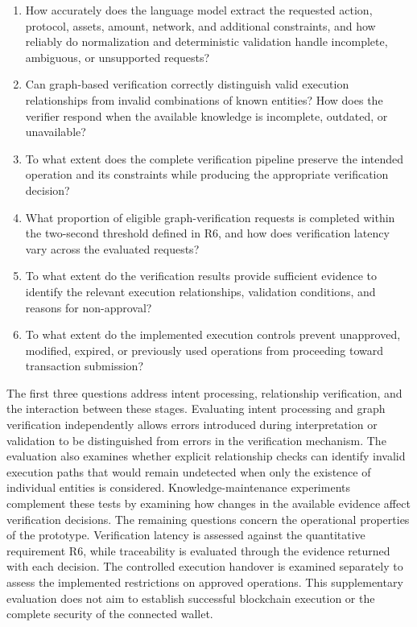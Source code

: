 \begin{enumerate}
    \item[\textbf{Q1:}] How accurately does the language model extract
    the requested action, protocol, assets, amount, network, and
    additional constraints, and how reliably do normalization and
    deterministic validation handle incomplete, ambiguous, or
    unsupported requests?

    \item[\textbf{Q2:}] Can graph-based verification correctly distinguish
    valid execution relationships from invalid combinations of known
    entities? How does the verifier respond when the available
    knowledge is incomplete, outdated, or unavailable?

    \item[\textbf{Q3:}] To what extent does the complete verification
    pipeline preserve the intended operation and its constraints
    while producing the appropriate verification decision?

    \item[\textbf{Q4:}] What proportion of eligible graph-verification
    requests is completed within the two-second threshold defined
    in R6, and how does verification latency vary across the
    evaluated requests?

    \item[\textbf{Q5:}] To what extent do the verification results
    provide sufficient evidence to identify the relevant execution
    relationships, validation conditions, and reasons for
    non-approval?

    \item[\textbf{Q6:}] To what extent do the implemented execution
    controls prevent unapproved, modified, expired, or previously
    used operations from proceeding toward transaction submission?
\end{enumerate}

The first three questions address intent processing, relationship
verification, and the interaction between these stages. Evaluating
intent processing and graph verification independently allows errors
introduced during interpretation or validation to be distinguished
from errors in the verification mechanism. The evaluation also
examines whether explicit relationship checks can identify invalid
execution paths that would remain undetected when only the existence
of individual entities is considered. Knowledge-maintenance
experiments complement these tests by examining how changes in
the available evidence affect verification decisions. The remaining questions concern the operational properties of the
prototype. Verification latency is assessed against the quantitative
requirement R6, while traceability is evaluated through the evidence
returned with each decision. The controlled execution handover is
examined separately to assess the implemented restrictions on
approved operations. This supplementary evaluation does not aim
to establish successful blockchain execution or the complete
security of the connected wallet.

